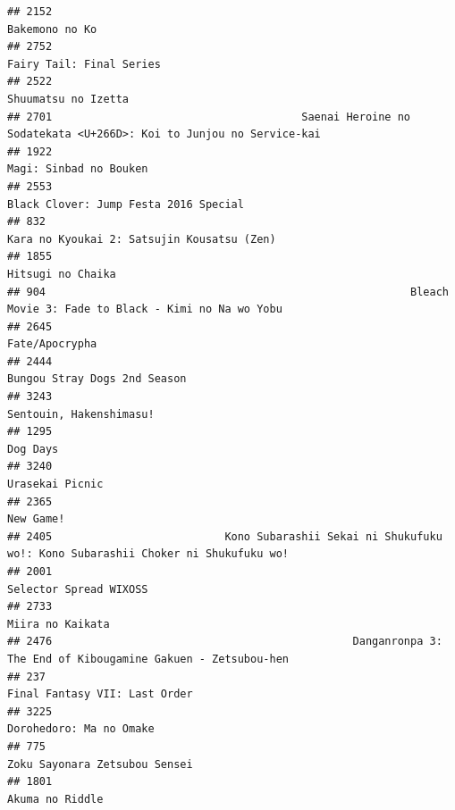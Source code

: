 \documentclass[
]{article}
\begin{document}
\begin{verbatim}
## 2152                                                                                            Bakemono no Ko
## 2752                                                                                  Fairy Tail: Final Series
## 2522                                                                                       Shuumatsu no Izetta
## 2701                                       Saenai Heroine no Sodatekata <U+266D>: Koi to Junjou no Service-kai
## 1922                                                                                    Magi: Sinbad no Bouken
## 2553                                                                     Black Clover: Jump Festa 2016 Special
## 832                                                                 Kara no Kyoukai 2: Satsujin Kousatsu (Zen)
## 1855                                                                                         Hitsugi no Chaika
## 904                                                         Bleach Movie 3: Fade to Black - Kimi no Na wo Yobu
## 2645                                                                                            Fate/Apocrypha
## 2444                                                                              Bungou Stray Dogs 2nd Season
## 3243                                                                                   Sentouin, Hakenshimasu!
## 1295                                                                                                  Dog Days
## 3240                                                                                           Urasekai Picnic
## 2365                                                                                                 New Game!
## 2405                           Kono Subarashii Sekai ni Shukufuku wo!: Kono Subarashii Choker ni Shukufuku wo!
## 2001                                                                                    Selector Spread WIXOSS
## 2733                                                                                          Miira no Kaikata
## 2476                                               Danganronpa 3: The End of Kibougamine Gakuen - Zetsubou-hen
## 237                                                                              Final Fantasy VII: Last Order
## 3225                                                                                   Dorohedoro: Ma no Omake
## 775                                                                              Zoku Sayonara Zetsubou Sensei
## 1801                                                                                           Akuma no Riddle

\end{verbatim}
\end{document}
